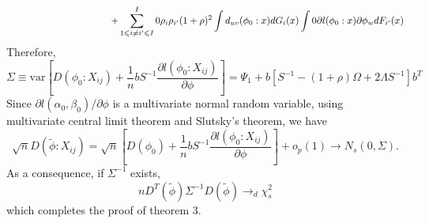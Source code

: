 \documentclass[11pt]{article}
\def\le{\leqslant}
\theoremstyle{plain}
\theoremstyle{definition}
\theoremstyle{remark}
\theoremstyle{definition}
\begin{document}
\begin{equation}
\hspace{1.5in}+\sum_{1\le i\ne i^\prime \le I}^I \frac{\rho_i \rho_{i^\prime}}{(1+\rho)^2}\int d_{uv}(\phi_0:x)dG_i(x)\int \frac{\partial l (\phi_0: x)}{\partial \phi_w}dF_{i^\prime}(x)
\end{equation}
Therefore,
\begin{equation}
\Sigma \equiv \mbox{var}\left[ D(\phi_0:X_{ij})+ \frac{1}{n}bS^{-1}\frac{\partial l(\phi_0: X_{ij})}{\partial \phi}\right] =\Psi_1 + b[S^{-1}-(1+\rho)\Omega + 2 \Lambda S^{-1}]b^T
\end{equation}
Since $\partial l(\alpha_0,\beta_0)/\partial \phi$ is a multivariate normal random variable, using multivariate central limit theorem and Slutsky's theorem, we have
\begin{equation}
\sqrt{n}D(\tilde{\phi}: X_{ij})=\sqrt{n}\left[D(\phi_0)
+\frac{1}{n}bS^{-1}\frac{\partial l(\phi_0: X_{ij})}{\partial \phi
}\right]+o_p(1)\rightarrow N_s(0,\Sigma).
\end{equation}
As a consequence, if $\Sigma^{-1}$ exists,
$$nD^T(\tilde{\phi})\Sigma^{-1}D(\tilde{\phi})\rightarrow_d \chi^2_s$$
\noindent which completes the proof of theorem 3.









\end{document}
